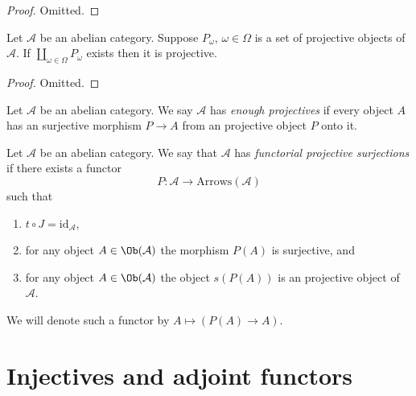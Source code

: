 \begin{proof}
Omitted.
\end{proof}

\begin{lemma}
\label{lemma-coproduct-projectives}
Let $\mathcal{A}$ be an abelian category.
Suppose $P_\omega$, $\omega \in \Omega$ is a set of projective
objects of $\mathcal{A}$. If $\coprod_{\omega \in \Omega} P_\omega$
exists then it is projective.
\end{lemma}

\begin{proof}
Omitted.
\end{proof}

\begin{definition}
\label{definition-enough-projectives}
Let $\mathcal{A}$ be an abelian category.
We say $\mathcal{A}$ has {\it enough projectives}
if every object $A$ has an surjective morphism
$P \to A$ from an projective object $P$ onto it.
\end{definition}

\begin{definition}
\label{definition-functorial-projective-surjections}
Let $\mathcal{A}$ be an abelian category.
We say that $\mathcal{A}$ has {\it functorial projective surjections}
if there exists a functor
$$
P : \mathcal{A} \longrightarrow \text{Arrows}(\mathcal{A})
$$
such that
\begin{enumerate}
\item $t \circ J = \text{id}_\mathcal{A}$,
\item for any object $A \in \Ob(\mathcal{A})$
the morphism $P(A)$ is surjective, and
\item for any object $A \in \Ob(\mathcal{A})$
the object $s(P(A))$ is an projective object of $\mathcal{A}$.
\end{enumerate}
We will denote such a functor by
$A \mapsto (P(A) \to A)$.
\end{definition}

















\section{Injectives and adjoint functors}
\label{section-adjoint}

